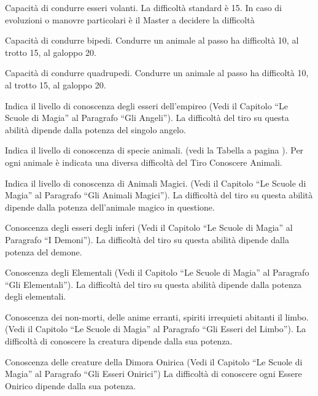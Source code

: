  Capacit\`a di condurre esseri volanti. La difficolt\`a standard
\`e 15. In caso di evoluzioni o manovre particolari \`e il Master
a decidere la difficolt\`a

Capacit\`a di condurre bipedi.  Condurre un animale al passo ha
difficolt\`a 10, al trotto 15, al galoppo 20.

 Capacit\`a di condurre
quadrupedi. Condurre un animale al passo ha difficolt\`a 10, al
trotto 15, al galoppo 20. 

\iffullversion
{} Indica il livello di conoscenza degli
esseri dell'empireo (Vedi il Capitolo ``Le Scuole di Magia'' al
Paragrafo ``Gli Angeli'').
La difficolt\`a del tiro su questa abilit\`a dipende dalla potenza
del singolo angelo.
\fi

 Indica il livello di conoscenza di
specie animali. (vedi la Tabella a pagina \pageref{tabanimali}). Per
ogni animale \`e indicata una diversa difficolt\`a del Tiro
Conoscere Animali.

\iffullversion
{} Indica il livello di conoscenza
di Animali Magici. (Vedi il Capitolo ``Le Scuole di Magia'' al
Paragrafo ``Gli Animali Magici'').  La difficolt\`a del tiro su questa
abilit\`a dipende dalla potenza dell'animale magico in questione.

 Conoscenza degli esseri degli inferi
(Vedi il Capitolo ``Le Scuole di Magia'' al Paragrafo ``I Demoni'').
La difficolt\`a del tiro su questa abilit\`a dipende dalla potenza
del demone.

 Conoscenza degli Elementali (Vedi
il Capitolo ``Le Scuole di Magia'' al Paragrafo ``Gli Elementali'').
La difficolt\`a del tiro su questa abilit\`a dipende dalla potenza
degli elementali.

 Conoscenza dei non-morti,
delle anime erranti, spiriti irrequieti abitanti il limbo. (Vedi il
Capitolo ``Le Scuole di Magia'' al Paragrafo ``Gli Esseri del
Limbo'').  La difficolt\`a di conoscere la creatura dipende dalla sua
potenza.


 Conoscenza delle creature della
Dimora Onirica (Vedi il Capitolo ``Le Scuole di Magia'' al Paragrafo ``Gli
Esseri Onirici'') La difficolt\`a di conoscere ogni Essere Onirico
dipende dalla sua potenza.
\fi

